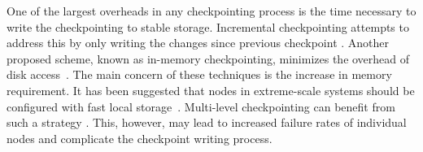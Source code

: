 One of the largest overheads in any checkpointing process is the time necessary to write the checkpointing 
to stable storage. Incremental checkpointing attempts
to address this by only writing the changes since previous checkpoint \cite{Agarwal:04:Adaptive}. %
Another proposed scheme, known as in-memory checkpointing, minimizes the overhead of disk access~\cite{zheng_2004_ftccharm,6264677}.
The main concern of these techniques is the increase in
memory requirement. %
It has been suggested that nodes in extreme-scale systems should be configured with fast local storage~\cite{doe_ascr_exascale_2011}. 
Multi-level checkpointing %
can benefit from such a strategy \cite{Moody:10:SCR}. This,
however, may lead to increased failure rates of individual nodes and complicate the checkpoint writing process.



